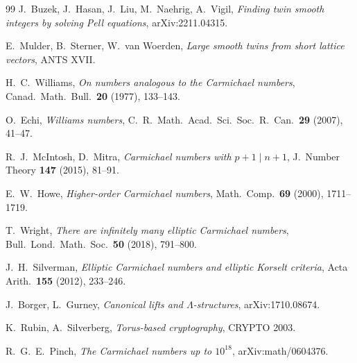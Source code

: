 \documentclass[11pt]{article}
\theoremstyle{remark}
\begin{document}
\begin{thebibliography}{99}
 J.~Buzek, J.~Hasan, J.~Liu, M.~Naehrig, A.~Vigil,
\emph{Finding twin smooth integers by solving Pell equations},
arXiv:2211.04315.

 E.~Mulder, B.~Sterner, W.~van Woerden, \emph{Large smooth
twins from short lattice vectors}, ANTS XVII.

 H.~C.~Williams, \emph{On numbers analogous to the
Carmichael numbers}, Canad.\ Math.\ Bull.\ \textbf{20} (1977), 133--143.

 O.~Echi, \emph{Williams numbers}, C.~R.\ Math.\ Acad.\
Sci.\ Soc.\ R.\ Can.\ \textbf{29} (2007), 41--47.

 R.~J.~McIntosh, D.~Mitra, \emph{Carmichael numbers
with $p+1 \mid n+1$}, J.\ Number Theory \textbf{147} (2015), 81--91.

 E.~W.~Howe, \emph{Higher-order Carmichael numbers},
Math.\ Comp.\ \textbf{69} (2000), 1711--1719.

 T.~Wright, \emph{There are infinitely many elliptic
Carmichael numbers}, Bull.\ Lond.\ Math.\ Soc.\ \textbf{50} (2018),
791--800.

 J.~H.~Silverman, \emph{Elliptic Carmichael numbers
and elliptic Korselt criteria}, Acta Arith.\ \textbf{155} (2012),
233--246.

 J.~Borger, L.~Gurney, \emph{Canonical lifts and
$\Lambda$-structures}, arXiv:1710.08674.

 K.~Rubin, A.~Silverberg, \emph{Torus-based cryptography},
CRYPTO 2003.

 R.~G.~E.~Pinch, \emph{The Carmichael numbers up to
$10^{18}$}, arXiv:math/0604376.

\end{thebibliography}
\end{document}
